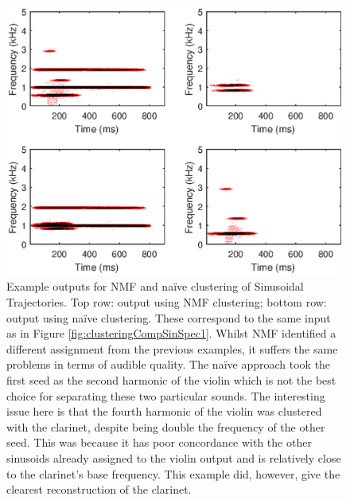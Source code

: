 \documentclass[12pt,a4paper,twoside,openright]{report}
\begin{document}
\begin{figure}
\centering
\includegraphics[width=0.7\linewidth]{../OutputSpectrograms/clusteringCompSinSpec2}
\caption[Example outputs for NMF and na\"{i}ve clustering of Sinusoidal Trajectories.]{Example outputs for NMF and na\"{i}ve clustering of Sinusoidal Trajectories. Top row: output using NMF clustering; bottom row: output using na\"{i}ve clustering. These correspond to the same input as in Figure \ref{fig:clusteringCompSinSpec1}. Whilst NMF identified a different assignment from the previous examples, it suffers the same problems in terms of audible quality. The na\"{i}ve approach took the first seed as the second harmonic of the violin which is not the best choice for separating these two particular sounds. The interesting issue here is that the fourth harmonic of the violin was clustered with the clarinet, despite being double the frequency of the other seed. This was because it has poor concordance with the other sinusoids already assigned to the violin output and is relatively close to the clarinet's base frequency. This example did, however, give the clearest reconstruction of the clarinet.}
\label{fig:clusteringCompSinSpec2}
\end{figure}

\end{document}

